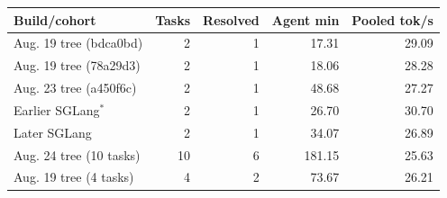 \begin{tabular}{lrrrr}
\toprule
Build/cohort & Tasks & Resolved & Agent min & Pooled tok/s \\
\midrule
Aug. 19 tree (bdca0bd) & 2 & 1 & 17.31 & 29.09 \\
Aug. 19 tree (78a29d3) & 2 & 1 & 18.06 & 28.28 \\
Aug. 23 tree (a450f6c) & 2 & 1 & 48.68 & 27.27 \\
Earlier SGLang$^{*}$ & 2 & 1 & 26.70 & 30.70 \\
Later SGLang & 2 & 1 & 34.07 & 26.89 \\
Aug. 24 tree (10 tasks) & 10 & 6 & 181.15 & 25.63 \\
Aug. 19 tree (4 tasks) & 4 & 2 & 73.67 & 26.21 \\
\bottomrule
\end{tabular}
